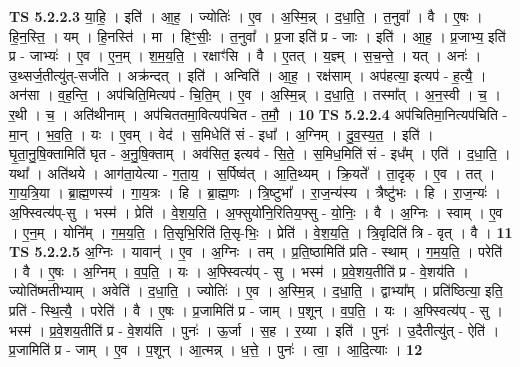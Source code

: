 \documentclass[17pt]{extarticle}
\begin{document}
                  \newline
                                \textbf{ TS 5.2.2.3} \newline
                  या॒हि॒ । इति॑ । आ॒ह॒ । ज्योतिः॑ । ए॒व । अ॒स्मि॒न्न् । द॒धा॒ति॒ । त॒नुवा᳚ । वै । ए॒षः । हि॒न॒स्ति॒ । यम् । हि॒नस्ति॑ । मा । हिꣳ॒॒सीः॒ । त॒नुवा᳚ । प्र॒जा इति॑ प्र - जाः । इति॑ । आ॒ह॒ । प्र॒जाभ्य॒ इति॑ प्र - जाभ्यः॑ । ए॒व । ए॒न॒म् । श॒म॒य॒ति॒ । रक्षाꣳ॑सि । वै । ए॒तत् । य॒ज्ञ्म् । स॒च॒न्ते॒ । यत् । अनः॑ । उ॒थ्सर्ज॒तीत्यु॑त्-सर्ज॑ति । अक्र॑न्दत् । इति॑ । अन्विति॑ । आ॒ह॒ । रक्ष॑साम् । अप॑हत्या॒ इत्यप॑ - ह॒त्यै॒ । अन॑सा । व॒ह॒न्ति॒ । अप॑चिति॒मित्यप॑ - चि॒ति॒म् । ए॒व । अ॒स्मि॒न्न् । द॒धा॒ति॒ । तस्मा᳚त् । अ॒न॒स्वी । च॒ । र॒थी । च॒ । अति॑थीनाम् । अप॑चिततमा॒वित्यप॑चित - त॒मौ॒ । \textbf{  10} \newline
                  \newline
                                \textbf{ TS 5.2.2.4} \newline
                  अप॑चितिमा॒नित्यप॑चिति - मा॒न् । भ॒व॒ति॒ । यः । ए॒वम् । वेद॑ । स॒मिधेति॑ सं - इधा᳚ । अ॒ग्निम् । दु॒व॒स्य॒त॒ । इति॑ । घृ॒ता॒नु॒षि॒क्तामिति॑ घृत - अ॒नु॒षि॒क्ताम् । अव॑सित॒ इत्यव॑ - सि॒ते॒ । स॒मिध॒मिति॑ सं - इध᳚म् । एति॑ । द॒धा॒ति॒ । यथा᳚ । अति॑थये । आग॑ता॒येत्या - ग॒ता॒य॒ । स॒र्पिष्व॑त् । आ॒ति॒थ्यम् । क्रि॒यते᳚ । ता॒दृक् । ए॒व । तत् । गा॒य॒त्रि॒या । ब्रा॒ह्म॒णस्य॑ । गा॒य॒त्रः । हि । ब्रा॒ह्म॒णः । त्रि॒ष्टुभा᳚ । रा॒ज॒न्य॑स्य । त्रैष्टु॑भः । हि । रा॒ज॒न्यः॑ । अ॒फ्स्वित्य॑प्-सु । भस्म॑ । प्रेति॑ । वे॒श॒य॒ति॒ । अ॒फ्सुयो॑नि॒रितिय॒फ्सु - यो॒निः॒ । वै । अ॒ग्निः । स्वाम् । ए॒व । ए॒न॒म् । योनि᳚म् । ग॒म॒य॒ति॒ । ति॒सृभि॒रिति॑ ति॒सृ-भिः॒ । प्रेति॑ । वे॒श॒य॒ति॒ । त्रि॒वृदिति॑ त्रि - वृत् । वै । \textbf{  11} \newline
                  \newline
                                \textbf{ TS 5.2.2.5} \newline
                  अ॒ग्निः । यावान्॑ । ए॒व । अ॒ग्निः । तम् । प्र॒ति॒ष्ठामिति॑ प्रति - स्थाम् । ग॒म॒य॒ति॒ । परेति॑ । वै । ए॒षः । अ॒ग्निम् । व॒प॒ति॒ । यः । अ॒फ्स्वित्य॑प् - सु । भस्म॑ । प्र॒वे॒शय॒तीति॑ प्र - वे॒शय॑ति । ज्योति॑ष्मतीभ्याम् । अवेति॑ । द॒धा॒ति॒ । ज्योतिः॑ । ए॒व । अ॒स्मि॒न्न् । द॒धा॒ति॒ । द्वाभ्या᳚म् । प्रति॑ष्ठित्या॒ इति॒ प्रति॑ - स्थि॒त्यै॒ । परेति॑ । वै । ए॒षः । प्र॒जामिति॑ प्र - जाम् । प॒शून् । व॒प॒ति॒ । यः । अ॒फ्स्वित्य॑प् - सु । भस्म॑ । प्र॒वे॒शय॒तीति॑ प्र - वे॒शय॑ति । पुनः॑ । ऊ॒र्जा । स॒ह । र॒य्या । इति॑ । पुनः॑ । उ॒दैतीत्यु॑त् - ऐति॑ । प्र॒जामिति॑ प्र - जाम् । ए॒व । प॒शून् । आ॒त्मन्न् । ध॒त्ते॒ । पुनः॑ । त्वा॒ । आ॒दि॒त्याः । \textbf{  12} \newline
\end{document}

